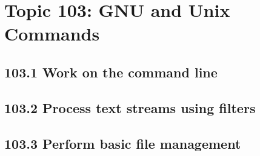 \documentclass[a4paper]{report}
\begin{document}
\chapter{Topic 103: GNU and Unix Commands}


\section*{103.1 Work on the command line}




\section*{103.2 Process text streams using filters}




\section*{103.3 Perform basic file management}
\end{document}
